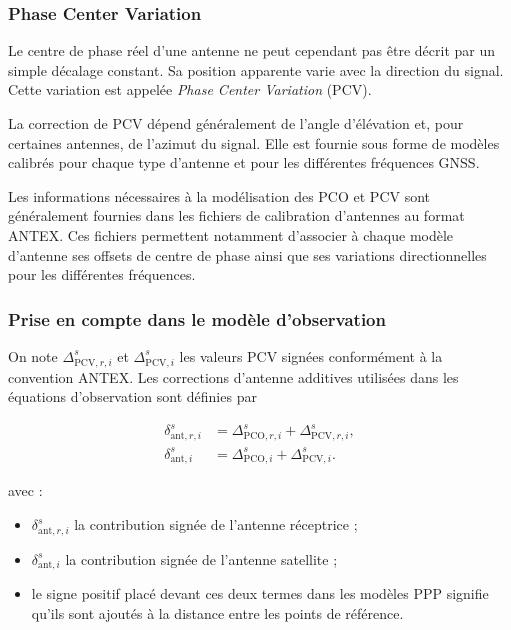 \subsubsection{Phase Center Variation}

Le centre de phase réel d'une antenne ne peut cependant pas être décrit par un
simple décalage constant. Sa position apparente varie avec la direction du
signal. Cette variation est appelée \textit{Phase Center Variation} (PCV).

La correction de PCV dépend généralement de l'angle d'élévation et, pour
certaines antennes, de l'azimut du signal. Elle est fournie sous forme de
modèles calibrés pour chaque type d'antenne et pour les différentes fréquences
GNSS.

Les informations nécessaires à la modélisation des PCO et PCV sont
généralement fournies dans les fichiers de calibration d'antennes au format
ANTEX. Ces fichiers permettent notamment d'associer à chaque modèle d'antenne
ses offsets de centre de phase ainsi que ses variations directionnelles pour
les différentes fréquences.

\subsubsection{Prise en compte dans le modèle d'observation}

On note $\Delta_{\mathrm{PCV},r,i}^s$ et
$\Delta_{\mathrm{PCV},i}^{s}$ les valeurs PCV signées conformément à la
convention ANTEX. Les corrections d'antenne additives utilisées dans les
équations d'observation sont définies par

\begin{align}
\delta_{\mathrm{ant},r,i}^s
&=
\Delta_{\mathrm{PCO},r,i}^s+\Delta_{\mathrm{PCV},r,i}^s,
\\
\delta_{\mathrm{ant},i}^{s}
&=
\Delta_{\mathrm{PCO},i}^{s}+\Delta_{\mathrm{PCV},i}^{s}.
\label{eq:antenna_signed_corrections}
\end{align}

avec :

\begin{itemize}
    \item $\delta_{\mathrm{ant},r,i}^s$ la contribution signée de l'antenne
    réceptrice ;
    \item $\delta_{\mathrm{ant},i}^{s}$ la contribution signée de l'antenne
    satellite ;
    \item le signe positif placé devant ces deux termes dans les modèles PPP
    signifie qu'ils sont ajoutés à la distance entre les points de référence.
\end{itemize}

